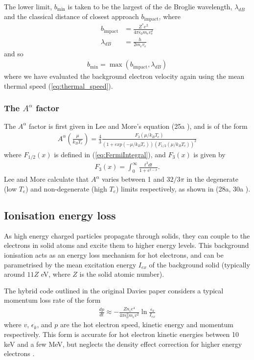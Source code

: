 \documentclass[12pt]{article}
\numberwithin{equation}{section}
\begin{document}
The lower limit, $b_\text{min}$ is taken to be the largest of the de Broglie wavelength, $\lambda_{dB}$ and the classical distance of closest approach $b_\text{impact}$, where
%
\begin{align}
  b_\text{impact} &= \frac{Z^*e^2}{4\pi\epsilon_0 m_e v_e^2} \\
  \lambda_{dB} &= \frac{h}{2m_ev_e}
\end{align}
%
and so
%
\begin{align}
  b_\text{min} = \max(b_\text{impact}, \lambda_{dB})
\end{align}
%
where we have evaluated the background electron velocity again using the mean thermal speed (\ref{eq:thermal_speed}).

\subsubsection{The $A^\alpha$ factor}

The $A^\alpha$ factor is first given in Lee and More's equation (25a \cite{eta:LeeMore}), and is of the form
%
\begin{align} \label{eq:A_alpha}
  A^\alpha\left( \frac{\mu}{k_BT_e} \right) = \frac{4}{3}\frac{F_3(\mu/k_BT_e)}{(1+exp(-\mu/k_BT_e))(F_{1/2}(\mu/k_BT_e))^2}
\end{align}
%
where $F_{1/2}(x)$ is defined in (\ref{eq:FermiIntegral}), and $F_3(x)$ is given by
%
\begin{align}
  F_{3}(x) = \int_0^\infty \frac{t^{3}dt}{1+e^{t-x}}.
\end{align}
%
Lee and More calculate that $A^{\alpha}$ varies between 1 and $32/3\pi$ in the degenerate (low $T_e$) and non-degenerate (high $T_e$) limits respectively, as shown in (28a, 30a \cite{eta:LeeMore}). 

\subsection{Ionisation energy loss} \label{sec:theory:coll}

As high energy charged particles propagate through solids, they can couple to the electrons in solid atoms and excite them to higher energy levels. This background ionisation acts as an energy loss mechanism for hot electrons, and can be parametrised by the mean excitation energy $I_{ex}$ of the background solid (typically around $11Z$ eV, where $Z$ is the solid atomic number).

The hybrid code outlined in the original Davies paper \cite{hybrid:Davies:1997} considers a typical momentum loss rate of the form
%
\begin{align}
  \frac{dp}{dt} \approx - \frac{Z n_i e^4}{4 \pi \epsilon_0^2 m_e v^2} \ln \frac{\epsilon_k}{I_{ex}}
\end{align}
%
where $v$, $\epsilon_k$, and $p$ are the hot electron speed, kinetic energy and momentum respectively. This form is accurate for hot electron kinetic energies between 10 keV and a few MeV, but neglects the density effect correction for higher energy electrons \cite{theory:ionisation:continuous}.
\end{document}
